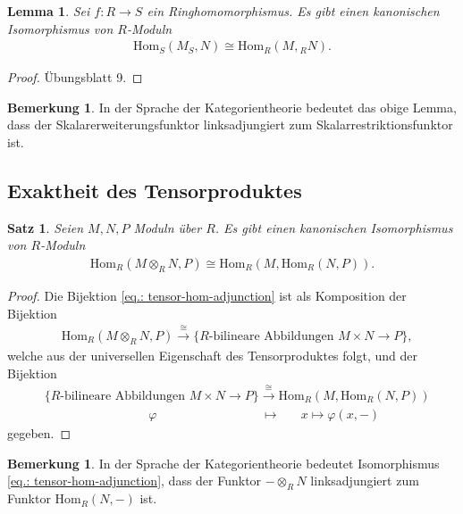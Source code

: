 \documentclass[reqno,12pt]{article}
\numberwithin{equation}{section}
\newcommand{\Hom}{\text{Hom}}
\theoremstyle{plain}
\newtheorem{lemma}[thm]{Lemma}
\newtheorem{proposition}[thm]{Satz}
\theoremstyle{definition}
\newtheorem{remark}[thm]{Bemerkung}
\newcommand{\blank}{{-}}
\begin{document}
\begin{lemma}
Sei $f \colon R \to S$ ein Ringhomomorphismus. Es gibt einen kanonischen Isomorphismus von $R$-Moduln
\begin{align*}
\Hom_S(M_S, N) \cong \Hom_R(M , {}_R N).
\end{align*}
\end{lemma}

\begin{proof}
Übungsblatt 9.
\end{proof}

\begin{remark}
In der Sprache der Kategorientheorie bedeutet das obige Lemma, dass der Skalarerweiterungsfunktor linksadjungiert zum Skalarrestriktionsfunktor ist.
\end{remark}


\subsection{Exaktheit des Tensorproduktes}

\begin{proposition}
Seien $M,N,P$ Moduln über $R$. Es gibt einen kanonischen Isomorphismus von $R$-Moduln
\begin{align}\label{eq.: tensor-hom-adjunction}
\Hom_R(M \otimes_R N , P) \cong \Hom_R(M,\Hom_R(N,P)).
\end{align}
\end{proposition}

\begin{proof}
Die Bijektion \eqref{eq.: tensor-hom-adjunction} ist als Komposition der Bijektion
\begin{align*}
& \Hom_R(M \otimes_R N , P) \overset{\cong}{\to}  \{R\text{-bilineare Abbildungen } M \times N \to P \},
\end{align*}
welche aus der universellen Eigenschaft des Tensorproduktes folgt, und der Bijektion
\begin{align*}
& \{R\text{-bilineare Abbildungen } M \times N \to P \} \overset{\cong}{\to} \Hom_R(M,\Hom_R(N,P)) \\
& \hspace{100pt} \varphi \hspace{100pt} \mapsto \hspace{20pt} x \mapsto \varphi(x, \blank)
\end{align*}
gegeben.
\end{proof}


\begin{remark}
In der Sprache der Kategorientheorie bedeutet Isomorphismus \eqref{eq.: tensor-hom-adjunction}, dass der Funktor $\blank \otimes_R N$ linksadjungiert zum Funktor $\Hom_R(N,\blank)$ ist.
\end{remark}
\end{document}
